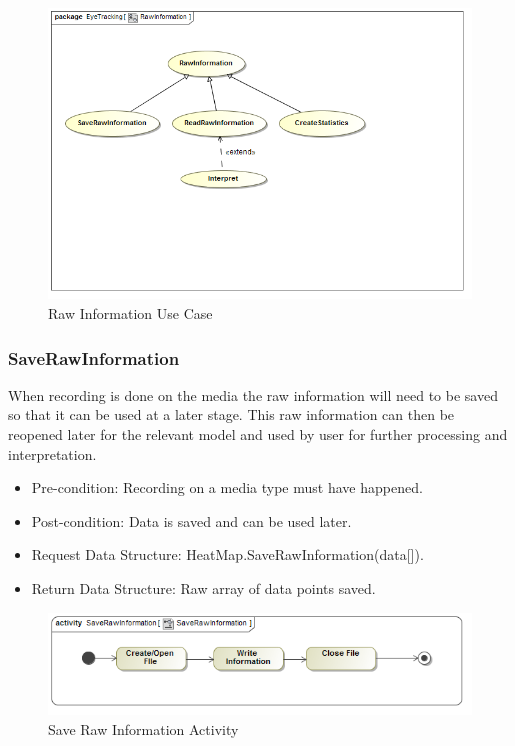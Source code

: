 \begin{figure}[!ht]
	\centering
	\includegraphics[scale=0.5]{Diagrams/Use_Case_Diagram__RawInformation.png}
	\caption{Raw Information Use Case}
\end{figure}
	
	\subsubsection{SaveRawInformation}
When recording is done on the media the raw information will need to be saved so that it can be used at a later stage. This raw information can then be reopened later for the relevant model and used by user for further processing and interpretation.
\begin{itemize}
\item Pre-condition: Recording on a media type must have happened.
\item Post-condition: Data is saved and can be used later.
\item Request Data Structure: HeatMap.SaveRawInformation(data[]).
\item Return Data Structure: Raw array of data points saved.
\end{itemize}

\begin{figure}[!ht]
	\centering
	\includegraphics[scale=0.5]{Diagrams/Activity_Diagram__SaveRawInformation__SaveRawInformation.png}
	\caption{Save Raw Information Activity}
\end{figure}

